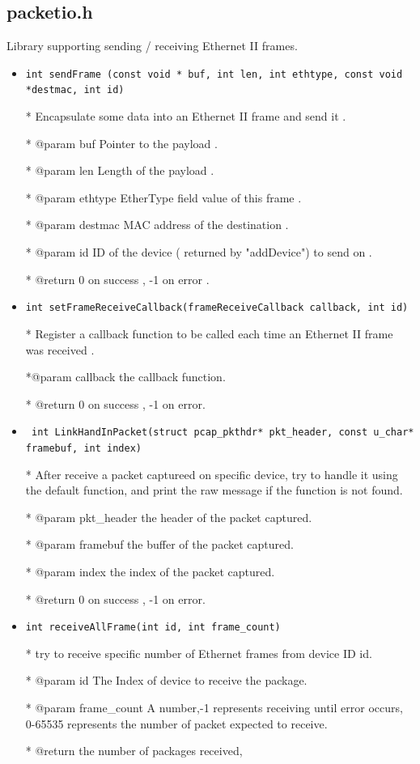 \documentclass[11pt]{article}
\begin{document}
	\subsection*{packetio.h}
	\par Library supporting sending / receiving Ethernet II frames.
	\begin{itemize}
		\item \texttt{int sendFrame (const void * buf, int len, int ethtype, const void *destmac, int id)}
		
		* Encapsulate some data into an Ethernet II frame and send it .
		
		* @param buf Pointer to the payload .
		
		* @param len Length of the payload .
		
		* @param ethtype EtherType field value of this frame .
		
		* @param destmac MAC address of the destination .
		
		* @param id ID of the device ( returned by "addDevice") to send on .
		
		* @return 0 on success , -1 on error .
		
		\item \texttt{int setFrameReceiveCallback(frameReceiveCallback callback, int id)}
		
		* Register a callback function to be called each time an Ethernet II frame was received .
		
		*@param callback the callback function.
		
		* @return 0 on success , -1 on error.
		
		\item \texttt{
			int LinkHandInPacket(struct pcap\_pkthdr* pkt\_header, const u\_char* framebuf, int index)}
			
			* After receive a packet captureed on specific device, try to handle it using the default function, and print the raw message if the function is not found.
			
			* @param pkt\_header the header of the packet captured.
			
			* @param framebuf the buffer of the packet captured.
			
			* @param index the index of the packet captured.
			
			* @return 0 on success , -1 on error.
		
		\item \texttt{int receiveAllFrame(int id, int frame\_count)}
		
		* try to receive specific number of Ethernet frames from device ID id.
		
		* @param id The Index of device to receive the package.
		
		* @param frame\_count A number,-1 represents receiving until error occurs, 0-65535 represents the number of packet expected to receive.
		
		* @return the number of packages received,
	\end{itemize}
	
\end{document}
